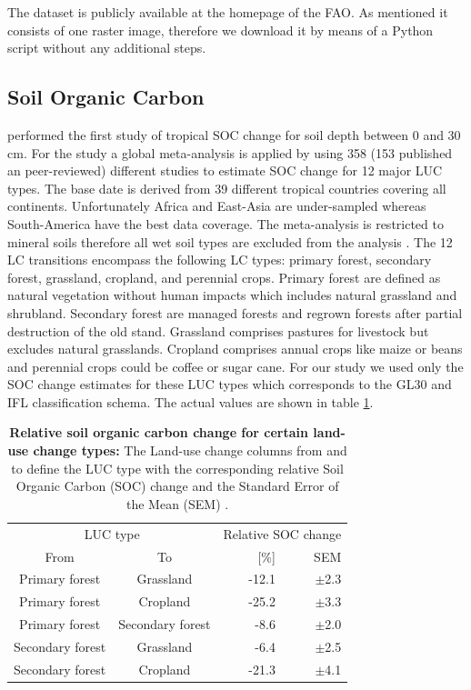 		The dataset is publicly available at the homepage of the \ac{FAO}. As mentioned it consists of one raster image, therefore we download it by means of a Python script without any additional steps.

	\subsection{Soil Organic Carbon}
		\citeauthor{Don2010} performed the first study of tropical \ac{SOC} change for soil depth between 0 and 30 cm. For the study a global meta-analysis is applied by using 358 (153 published an peer-reviewed) different studies to estimate \ac{SOC} change for 12 major \ac{LUC} types. The base date is derived from 39 different tropical countries covering all continents. Unfortunately Africa and East-Asia are under-sampled whereas South-America have the best data coverage. The meta-analysis is restricted to mineral soils therefore all wet soil types are excluded from the analysis \citeauthor{Don2010}. The 12 \ac{LC} transitions encompass the following \ac{LC} types: primary forest, secondary forest, grassland, cropland, and perennial crops. Primary forest are defined as natural vegetation without human impacts which includes natural grassland and shrubland. Secondary forest are managed forests and regrown forests after partial destruction of the old stand. Grassland comprises pastures for livestock but excludes natural grasslands. Cropland comprises annual crops like maize or beans and perennial crops could be coffee or sugar cane. For our study we used only the \ac{SOC} change estimates for these \ac{LUC} types which corresponds to the \ac{GL30} and \ac{IFL} classification schema. The actual values are shown in table \ref{tab:soc}.
		\begin{table}[ht]
			\centering
			\caption[Relative soil organic carbon change for certain land-use change types]{\textbf{Relative soil organic carbon change for certain land-use change types:} The Land-use change columns from and to define the LUC type with the corresponding relative Soil Organic Carbon (SOC) change and the Standard Error of the Mean (SEM) \citep{Don2010}.}
			\label{tab:soc}
			\begin{tabular}{ccrr}
				\hline
				\multicolumn{2}{c}{LUC type} & \multicolumn{2}{c}{Relative SOC change} \\
				From & To & [\%] & SEM \\\hline
				Primary forest & Grassland & -12.1 & $\pm$2.3 \\
				Primary forest & Cropland & -25.2 & $\pm$3.3 \\
				Primary forest & Secondary forest & -8.6 & $\pm$2.0 \\
				Secondary forest & Grassland & -6.4 & $\pm$2.5 \\
				Secondary forest & Cropland & -21.3 & $\pm$4.1 \\\hline
			\end{tabular}
		\end{table}

